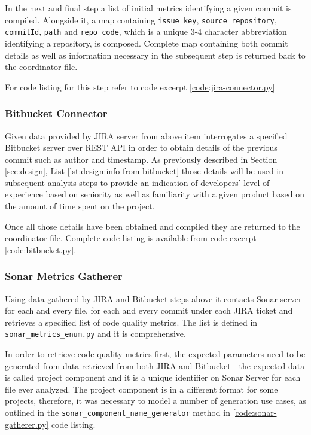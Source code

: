     
In the next and final step a list of initial metrics identifying a given commit is compiled. Alongside it, a map containing \texttt{issue\_key}, \texttt{source\_repository}, \texttt{commitId}, \texttt{path} and \texttt{repo\_code}, which is a unique 3-4 character abbreviation identifying a repository, is composed. Complete map containing both commit details as well as information necessary in the subsequent step is returned back to the coordinator file. 
    
For code listing for this step refer to code excerpt \ref{code:jira-connector.py}

\subsubsection{Bitbucket Connector}\label{sec:source-code:bitbucket}
Given data provided by JIRA server from above item interrogates a specified Bitbucket server over REST API in order to obtain details of the previous commit such as author and timestamp. As previously described in Section \ref{sec:design}, List \ref{lst:design:info-from-bitbucket} those details will be used in subsequent analysis steps to provide an indication of developers' level of experience based on seniority as well as familiarity with a given product based on the amount of time spent on the project.
    
Once all those details have been obtained and compiled they are returned to the coordinator file.
Complete code listing is available from code excerpt \ref{code:bitbucket.py}.
 
\subsubsection{Sonar Metrics Gatherer}\label{sec:source-code:sonar-metrics}
Using data gathered by JIRA and Bitbucket steps above it contacts Sonar server for each and every file, for each and every commit under each JIRA ticket and retrieves a specified list of code quality metrics. The list is defined in \texttt{sonar\_metrics\_enum.py} and it is comprehensive. 
    
In order to retrieve code quality metrics first, the expected parameters need to be generated from data retrieved from both JIRA and Bitbucket - the expected data is called project component and it is a unique identifier on Sonar Server for each file ever analyzed. The project component is in a different format for some projects, therefore, it was necessary to model a number of generation use cases, as outlined in the \texttt{sonar\_component\_name\_generator} method in \ref{code:sonar-gatherer.py} code listing.
    
